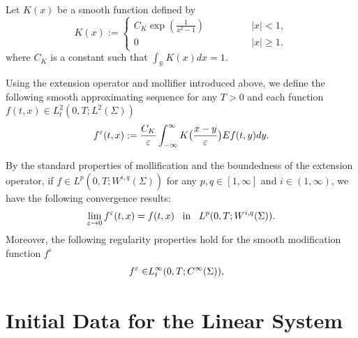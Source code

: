 \documentclass[letterpaper,reqno,10pt,twoside]{amsart}
\makeatletter
\renewcommand \theequation {%
	\ifnum \c@section>\z@ \@arabic\c@section.%
	\fi\@arabic\c@equation} \@addtoreset{equation}{section}
\theoremstyle{definition}
\theoremstyle{remark}
\makeatother
\begin{document}
\begin{appendix}
			Let $K(x)$ be a smooth function defined by
			\[
			K(x):=
			\begin{cases}
				C_{K}\exp(\frac{1}{x^{2}-1})\quad\quad\quad\quad&|x|<1,\\
				0\quad\quad\quad\quad\quad\quad\quad\quad\quad&|x|\geq1.
			\end{cases}
			\]
			\noindent where $C_{K}$ is a constant such that $
			\int_{\mathbb{R}}K(x)dx=1$.
			
			Using the extension operator and mollifier introduced above, we define the following smooth approximating sequence for any $T>0$ and each function $f(t,x)\in L_{t}^{2}(0,T;L^{2}(\Sigma))$
			\begin{align}{\label{def:smooth_0}}
				\begin{aligned}
					f^{\varepsilon}(t,x):=\frac{C_{K}}{\varepsilon}\int_{-\infty}^{\infty}K\big(\frac{x-y}{\varepsilon}\big)Ef(t,y)dy.
				\end{aligned}
			\end{align}
			
			By the standard properties of mollification and the boundedness of the extension operator, if $f\in L^{p}(0,T; W^{i,q}(\Sigma))$ for any $p,q\in [1,\infty]$ and $i\in (1,\infty)$, we have the following convergence results:
			\begin{align}{\label{eq:convergence_e}}
				\begin{aligned}
					\lim_{\varepsilon\rightarrow 0}f^{\varepsilon}(t,x)=f(t,x)~~\operatorname{in}~~L^{p}(0,T; W^{i,q}(\Sigma)).
				\end{aligned}
			\end{align}
			\noindent Moreover, the following regularity properties hold for the smooth modification function $f^{\varepsilon}$
			\begin{align}{\label{eq:smooth_e}}
				\begin{aligned}
					f^{\varepsilon} \in& L_{t}^{\infty}(0,T; C^{\infty}(\Sigma)),
				\end{aligned}
			\end{align}
			
			\makeatletter
			\renewcommand \theequation {%
				D.%
				\@arabic\c@equation} 
			\makeatother
			
			\section{Initial Data for the Linear System}{\label{sec:initial_l}}
			

\end{appendix}
\end{document}
